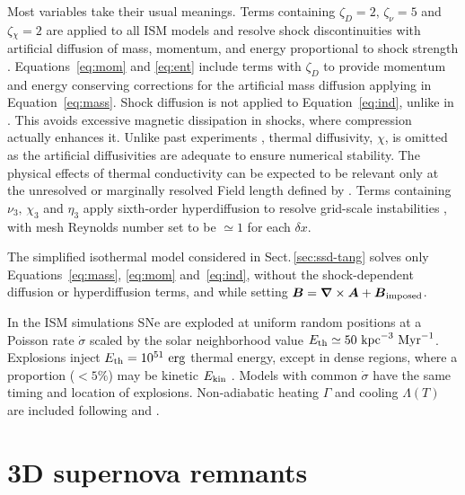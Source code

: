 \documentclass[fleqn,usenatbib]{mnras}
\newcommand\ESK{E_{\rm kin}}
\newcommand\EST{E_{\rm th}}
\newcommand{\vect}[1]{{{\mbox{\boldmath $#1$}}}}%
\newcommand\kpc{~ {\rm kpc}}
\newcommand\dx{ {\delta x}}
\newcommand\Myr{~ {\rm Myr}}
\newcommand\erg{~ {\rm erg}}
\begin{document}
 Most variables take their usual meanings.
 Terms containing $\zeta_D{=2},\,\zeta_\nu{=5}$ and $\zeta{_\chi=2}$
 {are applied to all ISM models and} resolve shock discontinuities with
 artificial diffusion of mass, momentum, and energy proportional to shock
 strength \citep[see][for details]{GMKSH20}.
 {Equations~\eqref{eq:mom} and \eqref{eq:ent} include terms with $\zeta_D$}
 {to} {provide momentum and energy conserving corrections for} {the}
 {artificial mass diffusion applying in Equation~\eqref{eq:mass}.}
 Shock diffusion is not applied to Equation~\eqref{eq:ind}{, unlike} {in}
 {\citet{Gent:2013b}.} {This avoids} {excessive magnetic dissipation in
   shocks, where compression actually enhances it.}
  {Unlike past} experiments \citep{Gent:2013b,Gent:2013a,GMKSH20},
 thermal diffusivity, $\chi$, {is omitted as} the artificial diffusivities
 are adequate to ensure numerical stability.
 {The} physical effects of thermal conductivity can be expected to be
 relevant only at the unresolved or marginally resolved Field length defined
 by \citet[][named after George Field, not the magnetic field]{BM90}.
 Terms containing $\nu_3,\,\chi_3$ and $\eta_3$ apply sixth-order hyperdiffusion
 to resolve grid-scale instabilities \citep[see, e.g.,][]{ABGS02,HB04}, {
   with mesh Reynolds number
% 
      set to be
$\simeq1$ for each $\dx$}.

 {The simplified isothermal model considered in
Sect.\,\ref{sec:ssd-tang} solves only Equations~{\eqref{eq:mass},}
 \eqref{eq:mom} and~\eqref{eq:ind}, without the shock-dependent diffusion or
 hyperdiffusion terms, and while setting
 $\vect{B}=\vect\nabla\times\vect{A}+\vect{B}_{\rm imposed}$.}

 {In the ISM simulations} SNe are exploded at {uniform} random positions
 at a Poisson rate $\dot\sigma$ {scaled by} the solar neighborhood
 value $\EST\simeq 50\kpc^{-3}\Myr^{-1}$.
 Explosions inject $\EST = 10^{51}\erg$ thermal energy, except in
 dense regions, where a proportion {($<5\%$) may be} kinetic $\ESK$ 
 \citep[see][]{GMKSH20}.
 {Models with common $\dot\sigma$ have the same timing and location of
 explosions.}
 Non-adiabatic heating $\Gamma$ and cooling $\Lambda (T)$ are included
 \citep{Gent:2013b} following \citet{Wolfire:1995} and \citet{Sarazin:1987}.

\section{3D supernova remnants
\label{sect:snowplough}}
\end{document}
